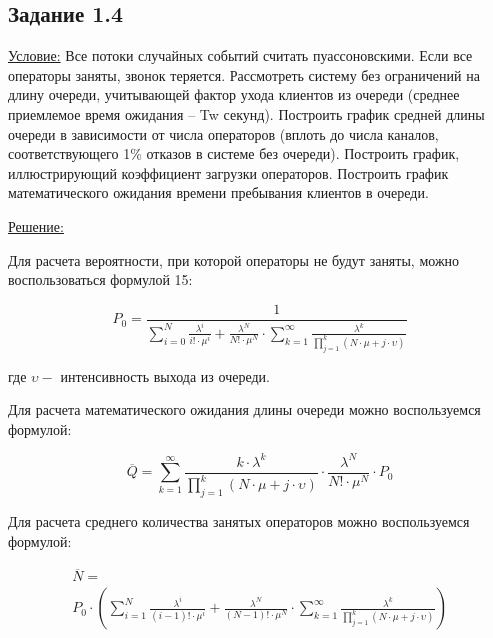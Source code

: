 \subsection*{Задание 1.4}


\underline{Условие:} Все потоки случайных событий считать пуассоновскими. Если все операторы заняты, звонок теряется. Рассмотреть систему без ограничений на длину очереди, учитывающей фактор ухода клиентов из очереди (среднее приемлемое время ожидания – Tw секунд). Построить график средней длины очереди в зависимости от числа операторов (вплоть до числа каналов, соответствующего 1$\%$  отказов в системе без очереди). Построить график, иллюстрирующий коэффициент загрузки операторов. Построить график математического ожидания времени пребывания клиентов в очереди.\par

\underline{Решение:}\par

Для расчета вероятности, при которой операторы не будут заняты, можно воспользоваться формулой 15:\par

\begin{equation}
     P_{0}=\frac{1}{ \sum _{i=0}^{N}\frac{ \lambda ^{i}}{i! \cdot  \mu ^{i}}+\frac{ \lambda ^{N}}{N! \cdot  \mu ^{N}} \cdot  \sum _{k=1}^{\infty}\frac{ \lambda ^{k}}{ \prod_{j=1}^{k} \left( N \cdot  \mu +j \cdot  \upsilon  \right) }}  
\end{equation} \par

где  \(  \upsilon -  \) интенсивность выхода из очереди.\par

Для расчета математического ожидания длины очереди можно воспользуемся формулой:

\begin{equation}
    \overline{Q}= \sum _{k=1}^{\infty}\frac{k \cdot  \lambda ^{k}}{ \prod_{j=1}^{k} \left( N \cdot  \mu +j \cdot  \upsilon  \right) } \cdot \frac{ \lambda ^{N}}{N! \cdot  \mu ^{N}} \cdot P_{0}
\end{equation} \par

Для расчета среднего количества занятых операторов можно воспользуемся формулой:

 \begin{multline} 
    \overline{N} = \\ P_{0}  \cdot  \left(  \sum _{i=1}^{N}\frac{ \lambda ^{i}}{ \left( i-1 \right) ! \cdot  \mu ^{i}}+ \frac{ \lambda ^{N}}{ \left( N-1 \right) ! \cdot  \mu ^{N}} \cdot   \sum _{k=1}^{\infty}\frac{ \lambda ^{k}}{ \prod_{j=1}^{k} \left( N \cdot  \mu +j \cdot  \upsilon  \right) } \right) 
\end{multline} \par

